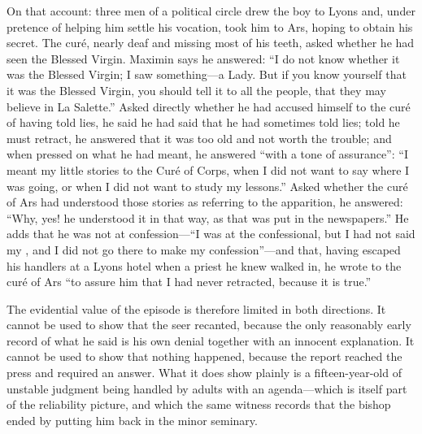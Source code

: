 On that account: three men of a political circle drew the boy to
Lyons and, under pretence of helping him settle his vocation, took
him to Ars, hoping to obtain his secret. The curé, nearly deaf and
missing most of his teeth, asked whether he had seen the Blessed
Virgin. Maximin says he answered: ``I do not know whether it was the
Blessed Virgin; I saw something---a Lady. But if you know yourself
that it was the Blessed Virgin, you should tell it to all the
people, that they may believe in La Salette.'' Asked directly
whether he had accused himself to the curé of having told lies, he
said he had said that he had sometimes told lies; told he must
retract, he answered that it was too old and not worth the trouble;
and when pressed on what he had meant, he answered ``with a tone of
assurance'': ``I meant my little stories to the Curé of Corps, when I
did not want to say where I was going, or when I did not want to
study my lessons.'' Asked whether the curé of Ars had understood
those stories as referring to the apparition, he answered: ``Why,
yes! he understood it in that way, as that was put in the
newspapers.'' He adds that he was not at confession---``I was at the
confessional, but I had not said my , and I did not
go there to make my confession''---and that, having escaped his
handlers at a Lyons hotel when a priest he knew walked in, he wrote
to the curé of Ars ``to assure him that I had never retracted,
because it is true.''

The evidential value of the episode is therefore limited in both
directions. It cannot be used to show that the seer recanted,
because the only reasonably early record of what he said is his own
denial together with an innocent explanation. It cannot be used to
show that nothing happened, because the report reached the press and
required an answer. What it does show plainly is a fifteen-year-old
of unstable judgment being handled by adults with an agenda---which
is itself part of the reliability picture, and which the same witness
records that the bishop ended by putting him back in the minor
seminary.

